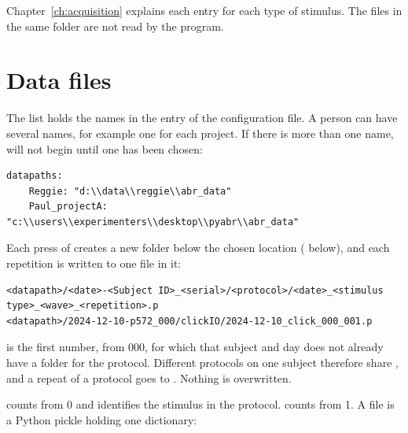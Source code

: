 Chapter~\ref{ch:acquisition} explains each entry for each type of stimulus. The
 files in the same folder are not read by the program.

\section{Data files}
\label{sec:data-files}

The  list holds the names in the  entry
of the configuration file. A person can have several names, for example one for each
project. If there is more than one name,  will not begin until
one has been chosen:

\begin{lstlisting}
datapaths:
    Reggie: "d:\\data\\reggie\\abr_data"
    Paul_projectA: "c:\\users\\experimenters\\desktop\\pyabr\\abr_data"
\end{lstlisting}

Each press of  creates a new folder below the chosen location
( below), and each repetition is written to one file in it:

\begin{lstlisting}
<datapath>/<date>-<Subject ID>_<serial>/<protocol>/<date>_<stimulus type>_<wave>_<repetition>.p
<datapath>/2024-12-10-p572_000/clickIO/2024-12-10_click_000_001.p
\end{lstlisting}

 is the first number, from 000, for which that subject and day does not
already have a folder for the protocol. Different protocols on one subject therefore
share , and a repeat of a protocol goes to . Nothing is
overwritten.

 counts from 0 and identifies the stimulus in the protocol.
 counts from 1. A file is a Python pickle holding one
dictionary:


